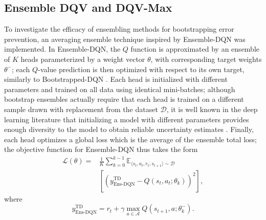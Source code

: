 \subsection{Ensemble DQV and DQV-Max}
To investigate the efficacy of ensembling methods for
bootstrapping error prevention, an averaging ensemble
technique inspired by Ensemble-DQN \citep{agarwal2020optimistic} was
implemented.
In Ensemble-DQN, the $Q$ function is approximated by
an ensemble of $K$ heads parameterized by a weight vector $\theta$,
with corresponding target weights $\theta^-$; each $Q$-value
prediction
is then optimized with respect to its own target,
similarly to Bootstrapped-DQN \citep{osband2016deep}. Each head is
initialized with different parameters and trained on all data using
identical mini-batches; although bootstrap ensembles actually require
that each head is trained on a different sample drawn with
replacement from the dataset $\mathcal{D}$, it is well known in the
deep learning literature that
initializing a model with different parameters provides enough
diversity to the model to obtain reliable uncertainty estimates
\citep{osband2016deep,levine2020offline}. Finally, each head optimizes
a global loss which is the average of the ensemble total loss; the
objective function for Ensemble-DQN thus takes the form
\begin{equation}
  \begin{aligned}
\mathcal{L}\left(\theta\right)=&\frac{1}{K}\sum_{k=0}^{k-1}\mathbb{E}_{\langle
                                 s_t,a_t,r_t,s_{t+1}\rangle\sim\mathcal{D}}\\
                               &\left[{\left(y^{\scriptscriptstyle\textrm{TD}}_{\scriptscriptstyle\textrm{Ens-DQN}}-Q\left(s_t,a_t;\theta_{k}\right)\right)}^2\right],
  \end{aligned}
\end{equation}
where
\begin{equation}
  y^{\scriptscriptstyle\textrm{TD}}_{\scriptscriptstyle\textrm{Ens-DQN}}=r_t+\gamma\max_{a\in\mathcal{A}}Q\left(s_{t+1},a;\theta_{k}^{-}\right).
\end{equation}


